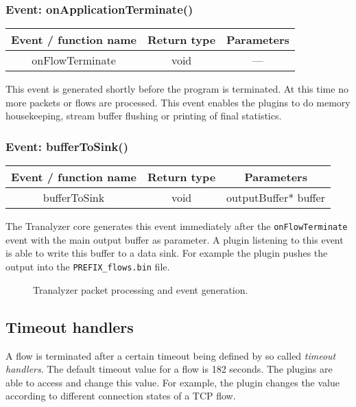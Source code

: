 \documentclass[documentation]{subfiles}
\begin{document}
\subsubsection{Event: onApplicationTerminate()}
\begin{longtable}{ccc}
    \toprule
    {\bf Event / function name} & {\bf Return type} & {\bf Parameters} \\
    \midrule\endhead%
    onFlowTerminate & void & --- \\
    \bottomrule
\end{longtable}
This event is generated shortly before the program is terminated. At this time no more packets or flows are processed. This event enables the plugins to do memory housekeeping, stream buffer flushing or printing of final statistics.

\subsubsection{Event: bufferToSink()}
\begin{longtable}{ccc}
    \toprule
    {\bf Event / function name} & {\bf Return type} & {\bf Parameters} \\
    \midrule\endhead%
    bufferToSink & void & outputBuffer* buffer \\
    \bottomrule
\end{longtable}
The Tranalyzer core generates this event immediately after the {\tt onFlowTerminate} event with the main output buffer as parameter. A plugin listening to this event is able to write this buffer to a data sink. For example the  plugin pushes the output into the {\tt PREFIX\_flows.bin} file.

\begin{figure}[ht]
    \centering
    \caption{Tranalyzer packet processing and event generation.}
\end{figure}

\subsection{Timeout handlers}
A flow is terminated after a certain timeout being defined by so called {\em timeout handlers}. The default timeout value for a flow is 182 seconds. The plugins are able to access and change this value. For example, the  plugin changes the value according to different connection states of a TCP flow.
\end{document}
